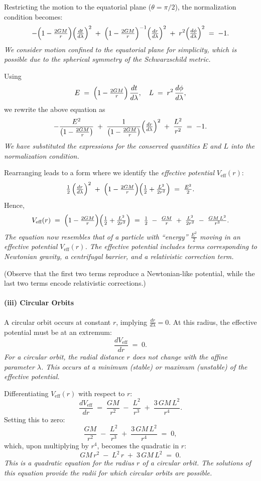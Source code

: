 \documentclass{article}
\begin{document}
Restricting the motion to the equatorial plane ($\theta = \pi/2$), the normalization condition becomes:
\[
-\Bigl(1 - \tfrac{2GM}{r}\Bigr)
\Bigl(\tfrac{dt}{d\lambda}\Bigr)^2
\;+\;\Bigl(1 - \tfrac{2GM}{r}\Bigr)^{-1}
\Bigl(\tfrac{dr}{d\lambda}\Bigr)^2
\;+\; r^2 \Bigl(\tfrac{d\phi}{d\lambda}\Bigr)^2
\;=\; -1.
\]
\textit{We consider motion confined to the equatorial plane for simplicity, which is possible due to the spherical symmetry of the Schwarzschild metric.}

Using
\[
E \;=\;\Bigl(1 - \tfrac{2GM}{r}\Bigr)\,\frac{dt}{d\lambda},
\quad
L \;=\; r^2\,\frac{d\phi}{d\lambda},
\]
we rewrite the above equation as
\[
-\frac{E^2}{\bigl(1 - \tfrac{2GM}{r}\bigr)}
\;+\;\frac{1}{\bigl(1 - \tfrac{2GM}{r}\bigr)}
\Bigl(\tfrac{dr}{d\lambda}\Bigr)^2
\;+\;\frac{L^2}{r^2}
\;=\; -1.
\]
\textit{We have substituted the expressions for the conserved quantities $E$ and $L$ into the normalization condition.}

Rearranging leads to a form where we identify the \emph{effective potential} $V_{\text{eff}}(r)$:
\[
\tfrac{1}{2}\,\Bigl(\tfrac{dr}{d\lambda}\Bigr)^2
\;+\;
\Bigl(1 - \tfrac{2GM}{r}\Bigr)\Bigl(\tfrac{1}{2} + \tfrac{L^2}{2r^2}\Bigr)
\;=\; \tfrac{E^2}{2}.
\]
Hence,
\[
V_{\text{eff}}(r)
\;=\;
\Bigl(1 - \tfrac{2GM}{r}\Bigr)\Bigl(\tfrac{1}{2} + \tfrac{L^2}{2r^2}\Bigr)
\;=\;
\tfrac{1}{2} \;-\;\tfrac{GM}{r} \;+\;\tfrac{L^2}{2r^2} \;-\;\tfrac{GM\,L^2}{r^3}.
\]
\textit{The equation now resembles that of a particle with “energy” $\tfrac{E^2}{2}$ moving in an effective potential $V_{\text{eff}}(r)$. The effective potential includes terms corresponding to Newtonian gravity, a centrifugal barrier, and a relativistic correction term.}

(Observe that the first two terms reproduce a Newtonian-like potential, while the last two terms encode relativistic corrections.)

\paragraph{(iii) Circular Orbits}

A circular orbit occurs at constant $r$, implying $\tfrac{dr}{d\lambda} = 0$. At this radius, the effective potential must be at an extremum:
\[
\frac{dV_{\text{eff}}}{dr} \;=\; 0.
\]
\textit{For a circular orbit, the radial distance $r$ does not change with the affine parameter $\lambda$. This occurs at a minimum (stable) or maximum (unstable) of the effective potential.}

Differentiating $V_{\text{eff}}(r)$ with respect to $r$:
\[
\frac{dV_{\text{eff}}}{dr}
\;=\;
\frac{GM}{r^2} \;-\;\frac{L^2}{r^3} \;+\;\frac{3\,GM\,L^2}{r^4}.
\]
Setting this to zero:
\[
\frac{GM}{r^2}
\;-\;\frac{L^2}{r^3}
\;+\;\frac{3\,GM\,L^2}{r^4}
\;=\;0,
\]
which, upon multiplying by $r^4$, becomes the quadratic in $r$:
\[
GM\,r^2
\;-\;L^2\,r
\;+\;3\,GM\,L^2
\;=\;0.
\]
\textit{This is a quadratic equation for the radius $r$ of a circular orbit. The solutions of this equation provide the radii for which circular orbits are possible.}
\end{document}
